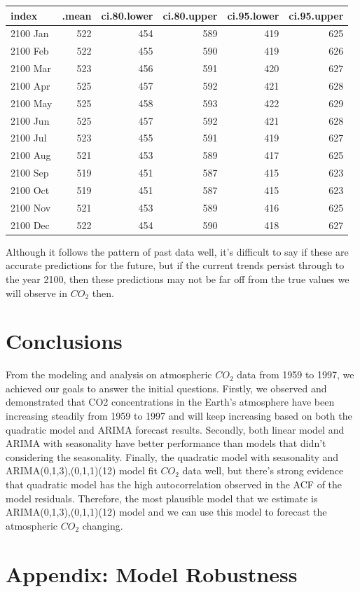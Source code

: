 \documentclass[AER]{AEA}
\begin{document}
\begin{longtable}[]{@{}lrrrrr@{}}
\toprule
index & .mean & ci.80.lower & ci.80.upper & ci.95.lower & ci.95.upper \\
\midrule
\endhead
2100 Jan & 522 & 454 & 589 & 419 & 625 \\
2100 Feb & 522 & 455 & 590 & 419 & 626 \\
2100 Mar & 523 & 456 & 591 & 420 & 627 \\
2100 Apr & 525 & 457 & 592 & 421 & 628 \\
2100 May & 525 & 458 & 593 & 422 & 629 \\
2100 Jun & 525 & 457 & 592 & 421 & 628 \\
2100 Jul & 523 & 455 & 591 & 419 & 627 \\
2100 Aug & 521 & 453 & 589 & 417 & 625 \\
2100 Sep & 519 & 451 & 587 & 415 & 623 \\
2100 Oct & 519 & 451 & 587 & 415 & 623 \\
2100 Nov & 521 & 453 & 589 & 416 & 625 \\
2100 Dec & 522 & 454 & 590 & 418 & 627 \\
\bottomrule
\end{longtable}

Although it follows the pattern of past data well, it's difficult to say
if these are accurate predictions for the future, but if the current
trends persist through to the year 2100, then these predictions may not
be far off from the true values we will observe in \(CO_2\) then.

\hypertarget{conclusions}{%
\section{Conclusions}\label{conclusions}}

From the modeling and analysis on atmospheric \(CO_{2}\) data from 1959
to 1997, we achieved our goals to answer the initial questions. Firstly,
we observed and demonstrated that CO2 concentrations in the Earth's
atmosphere have been increasing steadily from 1959 to 1997 and will keep
increasing based on both the quadratic model and ARIMA forecast results.
Secondly, both linear model and ARIMA with seasonality have better
performance than models that didn't considering the seasonality.
Finally, the quadratic model with seasonality and
ARIMA(0,1,3),(0,1,1)(12) model fit \(CO_{2}\) data well, but there's
strong evidence that quadratic model has the high autocorrelation
observed in the ACF of the model residuals. Therefore, the most
plausible model that we estimate is ARIMA(0,1,3),(0,1,1)(12) model and
we can use this model to forecast the atmospheric \(CO_{2}\) changing.




\appendix
\section{Appendix: Model Robustness}
\end{document}
